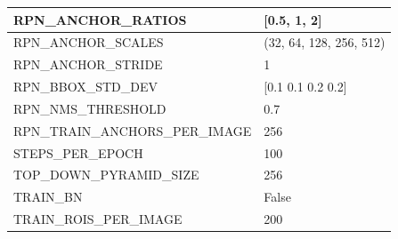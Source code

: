 \begin{longtable}[h]{|l|l|}
	RPN\_ANCHOR\_RATIOS             & {[}0.5, 1, 2{]}                                                                                                                                                                        \\ \hline
	RPN\_ANCHOR\_SCALES             & (32, 64, 128, 256, 512)                                                                                                                                                                \\ \hline
	RPN\_ANCHOR\_STRIDE             & 1                                                                                                                                                                                      \\ \hline
	RPN\_BBOX\_STD\_DEV             & {[}0.1 0.1 0.2 0.2{]}                                                                                                                                                                  \\ \hline
	RPN\_NMS\_THRESHOLD             & 0.7                                                                                                                                                                                    \\ \hline
	RPN\_TRAIN\_ANCHORS\_PER\_IMAGE & 256                                                                                                                                                                                    \\ \hline
	STEPS\_PER\_EPOCH               & 100                                                                                                                                                                                    \\ \hline
	TOP\_DOWN\_PYRAMID\_SIZE        & 256                                                                                                                                                                                    \\ \hline
	TRAIN\_BN                       & False                                                                                                                                                                                  \\ \hline
	TRAIN\_ROIS\_PER\_IMAGE         & 200                                                                                                                                                                                    \\ \hline

\end{longtable}
